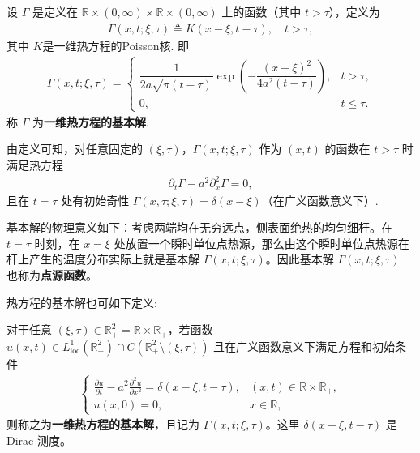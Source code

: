 \documentclass[../../main.tex]{subfiles}%
\begin{document}
\begin{definition}
设 $\varGamma $ 是定义在 $\mathbb{R}\times(0,\infty)\times\mathbb{R}\times(0,\infty)$ 上的函数（其中 $t>\tau$），定义为
\begin{align*}
\varGamma (x,t;\xi,\tau)\triangleq K(x-\xi,t-\tau),\quad t>\tau,
\end{align*}
其中 $K$是一维热方程的Poisson核. 即
\begin{align}
\varGamma (x,t;\xi,\tau)=
\begin{cases}
\dfrac{1}{2a\sqrt{\pi(t-\tau)}}\exp\left(-\dfrac{(x-\xi)^2}{4a^2(t-\tau)}\right), & t>\tau,\\[0.4cm]
0, & t\leqslant \tau.
\end{cases}
\end{align}
称 $\varGamma $ 为\textbf{一维热方程的基本解}.
\end{definition}
\begin{remark}
由定义可知，对任意固定的 $(\xi,\tau)$，$\varGamma (x,t;\xi,\tau)$ 作为 $(x,t)$ 的函数在 $t>\tau$ 时满足热方程
\begin{align*}
\partial_t \varGamma  - a^2\partial_x^2\varGamma  = 0,
\end{align*}
且在 $t=\tau$ 处有初始奇性 $\varGamma (x,\tau;\xi,\tau)=\delta(x-\xi)$（在广义函数意义下）.
\end{remark}
\begin{remark}
基本解的物理意义如下：考虑两端均在无穷远点，侧表面绝热的均匀细杆。在 $t=\tau$ 时刻，在 $x=\xi$ 处放置一个瞬时单位点热源，那么由这个瞬时单位点热源在杆上产生的温度分布实际上就是基本解 $\varGamma (x,t;\xi,\tau)$。因此基本解 $\varGamma (x,t;\xi,\tau)$ 也称为\textbf{点源函数}。
\end{remark}
\begin{remark}
热方程的基本解也可如下定义:

对于任意 $(\xi,\tau)\in\mathbb{R}_+^2=\mathbb{R}\times\mathbb{R}_+$，若函数 $u(x,t)\in L_{\mathrm{loc}}^1(\mathbb{R}_+^2)\cap C(\mathbb{R}_+^2\setminus(\xi,\tau))$ 且在广义函数意义下满足方程和初始条件
\begin{align*}
\begin{cases}
\frac{\partial u}{\partial t}-a^2\frac{\partial^2 u}{\partial x^2}=\delta(x-\xi,t-\tau), & (x,t)\in\mathbb{R}\times\mathbb{R}_+,\\
u(x,0)=0, & x\in\mathbb{R},
\end{cases}
\end{align*}
则称之为\textbf{一维热方程的基本解}，且记为 $\varGamma (x,t;\xi,\tau)$。这里 $\delta(x-\xi,t-\tau)$ 是 Dirac 测度。
\end{remark}
\end{document}
